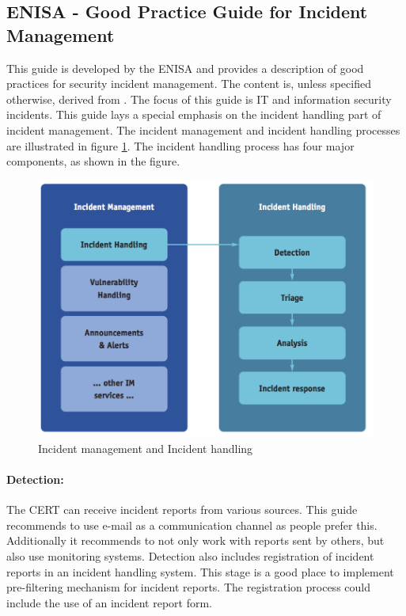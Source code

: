 \subsection{\acs{ENISA} - Good Practice Guide for Incident Management}
This guide is developed by the \ac{ENISA} and provides a description of good practices for security incident management. The content is, unless specified otherwise, derived from \cite{enisaGuide}. The focus of this guide is IT and information security incidents. This guide lays a special emphasis on the incident handling part of incident management. The incident management and incident handling processes are illustrated in figure \ref{fig:ENISAIncidentManagement}. The incident handling process has four major components, as shown in the figure. 

\begin{figure}[h]
\begin{center}
\includegraphics[scale=0.68]{enisaIncidentManagement.png}
\caption[Incident management and Incident handling]{Incident management and Incident handling \cite{enisaGuide}}
\label{fig:ENISAIncidentManagement}
\end{center}
\end{figure}

\paragraph{Detection:} The \ac{CERT} can receive incident reports from various sources. This guide recommends to use e-mail as a communication channel as people prefer this. Additionally it recommends to not only work with reports sent by others, but also use monitoring systems. Detection also includes registration of incident reports in an incident handling system. This stage is a good place to implement pre-filtering mechanism for incident reports. The registration process could include the use of an incident report form.

